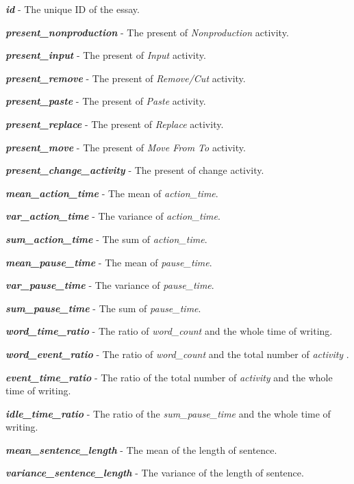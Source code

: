 \documentclass[8pt]{article}
\def\activity{\textit{activity} }
\begin{document}
{
\small
\begin{compactitem}
    \item \textbf{\textit{id}} - The unique ID of the essay.
    \item \textbf{\textit{present\_nonproduction}} - The present of \textit{Nonproduction} activity.
    \item \textbf{\textit{present\_input}} - The present of \textit{Input} activity.
    \item \textbf{\textit{present\_remove}} - The present of \textit{Remove/Cut} activity.
    \item \textbf{\textit{present\_paste}} - The present of \textit{Paste} activity.
    \item \textbf{\textit{present\_replace}} - The present of \textit{Replace} activity.
    \item \textbf{\textit{present\_move}} - The present of \textit{Move From To} activity.
    \item \textbf{\textit{present\_change\_activity}} - The present of change activity.
    \item \textbf{\textit{mean\_action\_time}} - The mean of \textit{action\_time}.
    \item \textbf{\textit{var\_action\_time}} - The variance of \textit{action\_time}.
    \item \textbf{\textit{sum\_action\_time}} - The sum of \textit{action\_time}.
    \item \textbf{\textit{mean\_pause\_time}} - The mean of \textit{pause\_time}.
    \item \textbf{\textit{var\_pause\_time}} - The variance of \textit{pause\_time}.
    \item \textbf{\textit{sum\_pause\_time}} - The sum of \textit{pause\_time}.
    \item \textbf{\textit{word\_time\_ratio}} - The ratio of \textit{word\_count} and the whole time of writing.
    \item \textbf{\textit{word\_event\_ratio}} - The ratio of \textit{word\_count} and the total number of \activity.
    \item \textbf{\textit{event\_time\_ratio}} - The ratio of the total number of \activity and the whole time of writing.
    \item \textbf{\textit{idle\_time\_ratio}} - The ratio of the \textit{sum\_pause\_time} and the whole time of writing.
    \item \textbf{\textit{mean\_sentence\_length}} - The mean of the length of sentence.
    \item \textbf{\textit{variance\_sentence\_length}} - The variance of the length of sentence.

\end{compactitem}}
\end{document}
